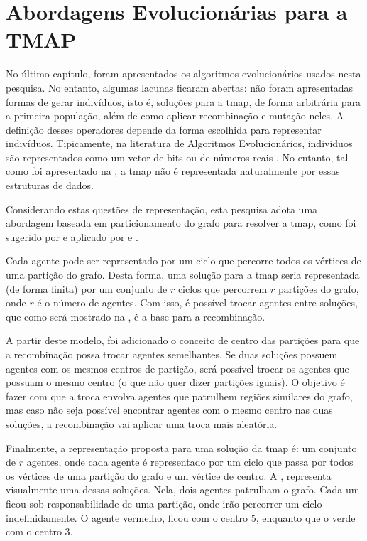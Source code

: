 \chapter{Abordagens Evolucionárias para a TMAP}
\label{chp:abordagens}

No último capítulo, foram apresentados os algoritmos evolucionários usados nesta 
pesquisa. No entanto, algumas lacunas ficaram abertas: não foram apresentadas 
formas de gerar indivíduos, isto é, soluções para a \ac{tmap}, de forma 
arbitrária para a primeira população, além de como aplicar 
recombinação e mutação neles. A definição desses operadores depende da forma 
escolhida para representar indivíduos. Tipicamente, na literatura de Algoritmos 
Evolucionários, indivíduos são representados como um vetor de bits ou de números 
reais \citep{Luke2013Metaheuristics}. No entanto, tal como foi apresentado na 
, a \ac{tmap} não é representada naturalmente por essas 
estruturas de dados.

Considerando estas questões de representação, esta pesquisa adota uma abordagem 
baseada em particionamento do grafo para resolver a \ac{tmap}, como foi sugerido 
por \citep{Chevaleyre:2004:TAM:1018411.1019013} e aplicado por 
\citep{Pippin:2013:PBT:2480362.2480378} e \citep{4630897}.

Cada agente pode ser representado por um ciclo que percorre todos os vértices de 
uma partição do grafo. Desta forma, uma solução para a \ac{tmap} seria 
representada (de forma finita) por um conjunto de $r$ ciclos que percorrem $r$ 
partições do grafo, onde $r$ é o número de agentes. Com isso, é possível trocar 
agentes entre soluções, que como será mostrado na , é a 
base para a recombinação.

A partir deste modelo, foi adicionado o conceito de centro das partições para que 
a recombinação possa trocar agentes semelhantes. Se duas soluções possuem agentes 
com os mesmos centros de partição, será possível trocar os agentes que possuam o 
mesmo centro (o que não quer dizer partições iguais). O objetivo é fazer com que 
a troca envolva agentes que patrulhem regiões similares do grafo, mas caso não 
seja possível encontrar agentes com o mesmo centro nas duas soluções, a 
recombinação vai aplicar uma troca mais aleatória.

Finalmente, a representação proposta para uma solução da \ac{tmap} é: um conjunto 
de $r$ agentes, onde cada agente é representado por um ciclo que passa por todos 
os vértices de uma partição do grafo e um vértice de centro. A 
, representa visualmente uma dessas soluções. Nela, 
dois agentes patrulham o grafo. Cada um ficou sob responsabilidade de uma 
partição, onde irão percorrer um ciclo indefinidamente. O agente vermelho, 
ficou com o centro $5$, enquanto que o verde com o centro 3.


